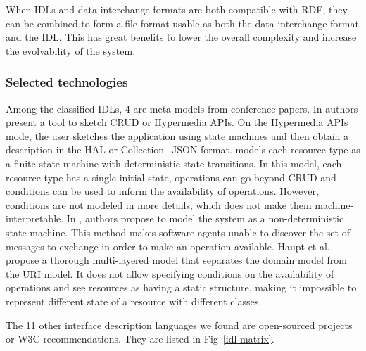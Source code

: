 When IDLs and data-interchange formats are both compatible with RDF, they can be combined to form a file format usable as both the data-interchange format and the IDL. This has great benefits to lower the overall complexity and increase the evolvability of the system.

\subsubsection{Selected technologies}

Among the classified IDLs, 4 are meta-models from conference papers.
In \cite{Rapido} authors present a tool to sketch CRUD or Hypermedia APIs. On the Hypermedia APIs mode, the user sketches the application using state machines and then obtain a description in the HAL or Collection+JSON format.
\cite{Schreier:2011:MRA:1967428.1967434} models each resource type as a finite state machine with deterministic state transitions. In this model, each resource type has a single initial state, operations can go beyond CRUD and conditions can be used to inform the availability of operations. However, conditions are not modeled in more details, which does not make them machine-interpretable.
In \cite{10.1007/978-3-642-22233-7_24}, authors propose to model the system as a non-deterministic state machine. This method makes software agents unable to discover the set of messages to exchange in order to make an operation available. Haupt et al.
\cite{10.1109/ICWS.2014.30} propose a thorough multi-layered model that separates the domain model from the URI model. It does not allow specifying conditions on the availability of operations and see resources as having a static structure, making it impossible to represent different state of a resource with different classes. 

The 11 other interface description languages we found are open-sourced projects or W3C recommendations. They are listed in Fig~\ref{idl-matrix}.


